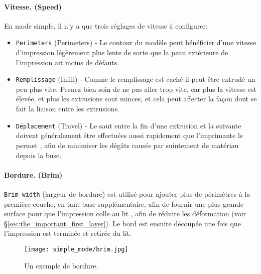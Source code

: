 \paragraph{Vitesse. (Speed)} %
\label{par:simple_speed}
En mode simple, il n'y a que trois r\'eglages de vitesse \`a configurer:
\begin{itemize}
	\item \texttt{Perimeters} (Perimeters) - Le contour du mod\`ele peut b\'en\'eficier d'une vitesse d'impression l\'eg\`erement plus lente de sorte que la peau ext\'erieure de l'impression ait moins de d\'efauts.
	\item \texttt{Remplissage} (Infill) - Comme le remplissage est cach\'e il peut \^etre extrud\'e un peu plus vite. Prenez bien soin de ne pas aller trop vite, car plus la vitesse est \'elev\'ee, et plus les extrusions sont minces, et cela peut affecter la façon dont se fait la liaison entre les extrusions.
	\item \texttt{D\'eplacement} (Travel) - Le saut entre la fin d'une extrusion et la suivante doivent g\'en\'eralement \^etre effectu\'ees aussi rapidement que l'imprimante le permet , afin de minimiser les d\'eg\^ats caus\'es par suintement de mat\'eriau depuis la buse.
\end{itemize}

\paragraph{Bordure. (Brim)} %
\label{par:simple_brim}
\texttt{Brim width} (largeur de bordure) est utilis\'e pour ajouter plus de p\'erim\`etres \`a la premi\`ere couche, en tant base suppl\'ementaire, afin de fournir une plus grande surface pour que l'impression colle au lit , afin de r\'eduire les d\'eformation (voir §\ref{sec:the_important_first_layer}). Le bord est ensuite d\'ecoup\'ee une fois que l'impression est termin\'ee et retir\'ee du lit.

\begin{figure}[H]
\centering
\texttt{[image: simple\_mode/brim.jpg]}
\caption{Un exemple de bordure.}
\label{fig:an_example_of_brim}
\end{figure}

